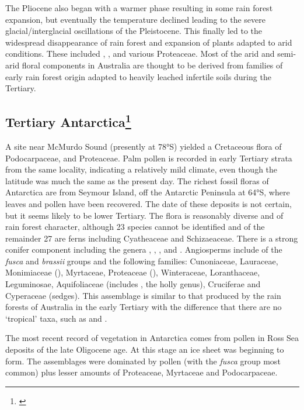 The Pliocene also began with a warmer phase resulting in some rain forest expansion, but eventually the temperature declined leading to the severe glacial/interglacial oscillations of the Pleistocene.
This finally led to the widespread disappearance of rain forest and expansion of plants adapted to arid conditions.
These included , ,  and various Proteaceae.
Most of the arid and semi-arid floral components in Australia are thought to be derived from families of early rain forest origin adapted to heavily leached infertile soils during the Tertiary.

\subsection[Tertiary Antarctica]{Tertiary Antarctica\footnote{\cite{wace1965vascular}}}

A site near McMurdo Sound (presently at 78°S) yielded a Cretaceous flora of Podocarpaceae,  and Proteaceae.
Palm pollen is recorded in early Tertiary strata from the same locality, indicating a relatively mild climate, even though the latitude was much the same as the present day.
The richest fossil floras of Antarctica are from Seymour Island, off the Antarctic Peninsula at 64°S, where leaves and pollen have been recovered.
The date of these deposits is not certain, but it seems likely to be lower Tertiary.
The flora is reasonably diverse and of rain forest character, although 23 species cannot be identified and of the remainder 27 are ferns including Cyatheaceae and Schizaeaceae.
There is a strong conifer component including the genera , , ,  and .
Angiosperms include  of the \emph{fusca} and \emph{brassii} groups and the following families: Cunoniaceae, Lauraceae, Monimiaceae (), Myrtaceae, Proteaceae (), Winteraceae, Loranthaceae, Leguminosae, Aquifoliaceae (includes , the holly genus), Cruciferae and Cyperaceae (sedges).
This assemblage is similar to that produced by the rain forests of Australia in the early Tertiary with the difference that there are no `tropical' taxa, such as  and .

The most recent record of vegetation in Antarctica comes from pollen in Ross Sea deposits of the late Oligocene age.
At this stage an ice sheet was beginning to form.
The assemblages were dominated by  pollen (with the \emph{fusca} group most common) plus lesser amounts of Proteaceae, Myrtaceae and Podocarpaceae.

